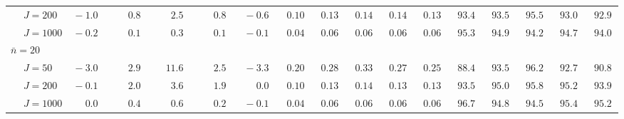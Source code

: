 \begin{sidewaystable}
\begin{threeparttable}
\begin{tabular}{llccccccccccccccc}
 & \nopagebreak $\;J=200$  & $\phantom{0}{-}1.0\phantom{0}$ & $\phantom{0}\phantom{-}0.8\phantom{0}$ & $\phantom{0}\phantom{-}2.5\phantom{0}$ & $\phantom{0}\phantom{-}0.8\phantom{0}$ & $\phantom{0}{-}0.6\phantom{0}$ & $\phantom{0}0.10\phantom{0}$ & $\phantom{0}0.13\phantom{0}$ & $\phantom{0}0.14\phantom{0}$ & $\phantom{0}0.14\phantom{0}$ & $\phantom{0}0.13\phantom{0}$ & $\phantom{0}93.4\phantom{0}$ & $\phantom{0}93.5\phantom{0}$ & $\phantom{0}95.5\phantom{0}$ & $\phantom{0}93.0\phantom{0}$ & $\phantom{0}92.9\phantom{0}$ \\
 & \nopagebreak $\;J=1000$  & $\phantom{0}{-}0.2\phantom{0}$ & $\phantom{0}\phantom{-}0.1\phantom{0}$ & $\phantom{0}\phantom{-}0.3\phantom{0}$ & $\phantom{0}\phantom{-}0.1\phantom{0}$ & $\phantom{0}{-}0.1\phantom{0}$ & $\phantom{0}0.04\phantom{0}$ & $\phantom{0}0.06\phantom{0}$ & $\phantom{0}0.06\phantom{0}$ & $\phantom{0}0.06\phantom{0}$ & $\phantom{0}0.06\phantom{0}$ & $\phantom{0}95.3\phantom{0}$ & $\phantom{0}94.9\phantom{0}$ & $\phantom{0}94.2\phantom{0}$ & $\phantom{0}94.7\phantom{0}$ & $\phantom{0}94.0\phantom{0}$ \\
\multicolumn{4}{l}{$\bar{n}=20$} \\  & \nopagebreak $\;J=50$  & $\phantom{0}{-}3.0\phantom{0}$ & $\phantom{0}\phantom{-}2.9\phantom{0}$ & $\phantom{-}11.6\phantom{0}$ & $\phantom{0}\phantom{-}2.5\phantom{0}$ & $\phantom{0}{-}3.3\phantom{0}$ & $\phantom{0}0.20\phantom{0}$ & $\phantom{0}0.28\phantom{0}$ & $\phantom{0}0.33\phantom{0}$ & $\phantom{0}0.27\phantom{0}$ & $\phantom{0}0.25\phantom{0}$ & $\phantom{0}88.4\phantom{0}$ & $\phantom{0}93.5\phantom{0}$ & $\phantom{0}96.2\phantom{0}$ & $\phantom{0}92.7\phantom{0}$ & $\phantom{0}90.8\phantom{0}$ \\
 & \nopagebreak $\;J=200$  & $\phantom{0}{-}0.1\phantom{0}$ & $\phantom{0}\phantom{-}2.0\phantom{0}$ & $\phantom{0}\phantom{-}3.6\phantom{0}$ & $\phantom{0}\phantom{-}1.9\phantom{0}$ & $\phantom{0}\phantom{-}0.0\phantom{0}$ & $\phantom{0}0.10\phantom{0}$ & $\phantom{0}0.13\phantom{0}$ & $\phantom{0}0.14\phantom{0}$ & $\phantom{0}0.13\phantom{0}$ & $\phantom{0}0.13\phantom{0}$ & $\phantom{0}93.5\phantom{0}$ & $\phantom{0}95.0\phantom{0}$ & $\phantom{0}95.8\phantom{0}$ & $\phantom{0}95.2\phantom{0}$ & $\phantom{0}93.9\phantom{0}$ \\
 & \nopagebreak $\;J=1000$  & $\phantom{0}\phantom{-}0.0\phantom{0}$ & $\phantom{0}\phantom{-}0.4\phantom{0}$ & $\phantom{0}\phantom{-}0.6\phantom{0}$ & $\phantom{0}\phantom{-}0.2\phantom{0}$ & $\phantom{0}{-}0.1\phantom{0}$ & $\phantom{0}0.04\phantom{0}$ & $\phantom{0}0.06\phantom{0}$ & $\phantom{0}0.06\phantom{0}$ & $\phantom{0}0.06\phantom{0}$ & $\phantom{0}0.06\phantom{0}$ & $\phantom{0}96.7\phantom{0}$ & $\phantom{0}94.8\phantom{0}$ & $\phantom{0}94.5\phantom{0}$ & $\phantom{0}95.4\phantom{0}$ & $\phantom{0}95.2\phantom{0}$ \\

\end{tabular}
\end{threeparttable}
\end{sidewaystable}
